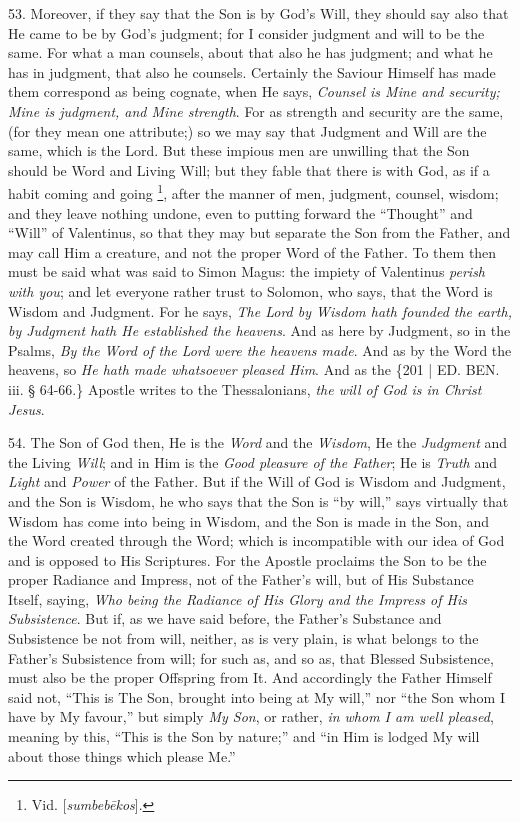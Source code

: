 53. Moreover, if they say that
the Son is by God's Will, they should say also that He came to be by
God's judgment; for I consider judgment and will to be the same. For
what a man counsels, about that also he has judgment; and what he has
in judgment, that also he counsels. Certainly the Saviour Himself has
made them correspond as being cognate, when He says, \emph{Counsel is
Mine and security; Mine is judgment, and Mine strength}. For as
strength and security are the same, (for they mean one attribute;) so
we may say that Judgment and Will are the same, which is the Lord. But
these impious men are unwilling that the Son should be Word and Living
Will; but they fable that there is with God, as if a habit coming and
going \footnote{Vid. [\emph{sumbeb\={e}kos}].}, after the manner
of men, judgment, counsel, wisdom; and they leave nothing undone, even
to putting forward the ``Thought'' and ``Will'' of Valentinus, so that
they may but separate the Son from the Father, and may call Him a
creature, and not the proper Word of the Father. To them then must be
said what was said to Simon Magus: the impiety of Valentinus \emph{perish
with you}; and let everyone rather trust to Solomon, who says, that
the Word is Wisdom and Judgment. For he says, \emph{The Lord by Wisdom
hath founded the earth, by Judgment hath He established the heavens}.
And as here by Judgment, so in the Psalms, \emph{By the Word of the Lord
were the heavens made}. And as by the Word the heavens, so \emph{He
hath made whatsoever pleased Him}. And as the \{201 | ED.
BEN. iii. § 64-66.\} Apostle writes to the
Thessalonians, \emph{the will of God is in Christ Jesus}.

54. The Son of God then, He is
the \emph{Word} and the \emph{Wisdom}, He the \emph{Judgment} and the
Living \emph{Will}; and in Him is the \emph{Good pleasure of the Father};
He is \emph{Truth} and \emph{Light} and \emph{Power} of the Father.
But if the Will of God is Wisdom and Judgment, and the Son is Wisdom,
he who says that the Son is ``by will,'' says virtually that Wisdom has
come into being in Wisdom, and the Son is made in the Son, and the
Word created through the Word; which is incompatible with our idea of
God and is opposed to His Scriptures. For the Apostle proclaims the
Son to be the proper Radiance and Impress, not of the Father's will,
but of His Substance Itself, saying, \emph{Who being the Radiance of His
Glory and the Impress of His Subsistence}. But if, as we have said
before, the Father's Substance and Subsistence be not from will,
neither, as is very plain, is what belongs to the Father's Subsistence
from will; for such as, and so as, that Blessed Subsistence, must also
be the proper Offspring from It. And accordingly the Father Himself
said not, ``This is The Son, brought into being at My will,'' nor ``the
Son whom I have by My favour,'' but simply \emph{My Son}, or rather, \emph{in
whom I am well pleased}, meaning by this, ``This is the Son by
nature;'' and ``in Him is lodged My will about those things which please
Me.''

